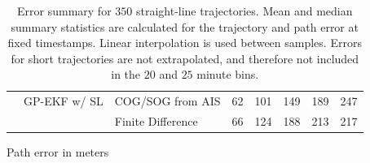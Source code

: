 \begin{table}[b]
\begin{subtable}{\textwidth}
{\begin{tabular}{lllrrrrr}
                        & GP-EKF w/ SL   & COG/SOG from AIS  & 62  & 101 & 149 & 189 & 247 \\
                        &                & Finite Difference & 66  & 124 & 188 & 213 & 217 \\
                \bottomrule
            \end{tabular}
        }
        \caption{Path error in meters}
        \label{table:stats_straight_path_err}
    \end{subtable}
    \caption{Error summary for $350$ straight-line trajectories. Mean and median summary statistics are calculated for the trajectory and path error at fixed timestamps. Linear interpolation is used between samples. Errors for short trajectories are not extrapolated, and therefore not included in the $20$ and $25$ minute bins.}
    \label{table:stats_straight_line_error}
\end{table}

